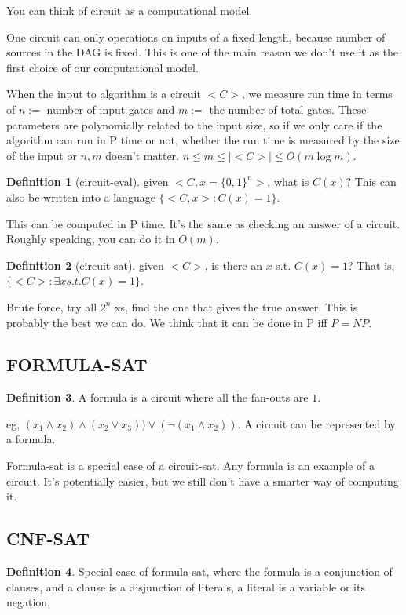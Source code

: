 \documentclass{article}
\theoremstyle{plain}
\theoremstyle{definition}
\newtheorem{definition}{Definition}[section] %
\begin{document}
You can think of circuit as a computational model.

One circuit can only operations on inputs of a fixed length, because number of sources in the DAG is fixed. This is one of the main reason we don't use it as the first choice of our computational model. 

When the input to algorithm is a circuit $<C>$, we measure run time in terms of $n:=$ number of input gates and $m:=$ the number of total gates. These parameters are polynomially related to the input size, so if we only care if the algorithm can run in P time or not, whether the run time is measured by the size of the input or $n,m$ doesn't matter. $n \le m \le |<C>| \le O(m\log m)$. 

\begin{definition}[circuit-eval]
given $<C,x=\{0,1\}^n>$, what is $C(x)$? This can also be written into a language $\{<C,x>: C(x)=1\}$.
\end{definition}
This can be computed in P time. It's the same as checking an answer of a circuit. Roughly speaking, you can do it in $O(m)$. 

\begin{definition}[circuit-sat]
given $<C>$, is there an $x$ s.t. $C(x)=1$? That is, $\{<C>: \exists x s.t. C(x)=1\}$.
\end{definition}
Brute force, try all $2^n$ xs, find the one that gives the true answer. This is probably the best we can do. We think that it can be done in P iff $P=NP$.

\subsection{FORMULA-SAT}

\begin{definition}
A formula is a circuit where all the fan-outs are $1$. 
\end{definition}
eg, $(x_1 \land x_2) \land (x_2 \lor x_3)) \lor (\lnot(x_1 \land x_2))$. A circuit can be represented by a formula. 

Formula-sat is a special case of a circuit-sat. Any formula is an example of a circuit. It's potentially easier, but we still don't have a smarter way of computing it. 

\subsection{CNF-SAT}

\begin{definition}
Special case of formula-sat, where the formula is a conjunction of clauses, and a clause is a disjunction of literals, a literal is a variable or its negation. 
\end{definition}
\end{document}
